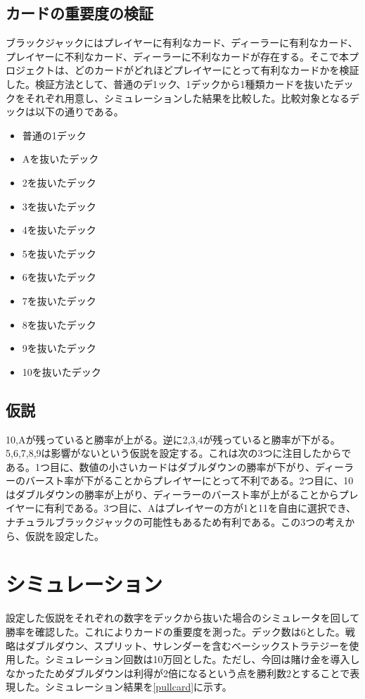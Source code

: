 \subsection{カードの重要度の検証}
ブラックジャックにはプレイヤーに有利なカード、ディーラーに有利なカード、プレイヤーに不利なカード、ディーラーに不利なカードが存在する。そこで本プロジェクトは、どのカードがどれほどプレイヤーにとって有利なカードかを検証した。検証方法として、普通のデ1ック、1デックから1種類カードを抜いたデックをそれぞれ用意し、シミュレーションした結果を比較した。比較対象となるデックは以下の通りである。

\begin{itemize}
  \item 普通の1デック
  \item Aを抜いたデック
  \item 2を抜いたデック
  \item 3を抜いたデック
  \item 4を抜いたデック
  \item 5を抜いたデック
  \item 6を抜いたデック
  \item 7を抜いたデック
  \item 8を抜いたデック
  \item 9を抜いたデック
  \item 10を抜いたデック
\end{itemize}

\subsection{仮説}
10,Aが残っていると勝率が上がる。逆に2,3,4が残っていると勝率が下がる。5,6,7,8,9は影響がないという仮説を設定する。これは次の3つに注目したからである。1つ目に、数値の小さいカードはダブルダウンの勝率が下がり、ディーラーのバースト率が下がることからプレイヤーにとって不利である。2つ目に、10はダブルダウンの勝率が上がり、ディーラーのバースト率が上がることからプレイヤーに有利である。3つ目に、Aはプレイヤーの方が1と11を自由に選択でき、ナチュラルブラックジャックの可能性もあるため有利である。この3つの考えから、仮説を設定した。

\section{シミュレーション}
設定した仮説をそれぞれの数字をデックから抜いた場合のシミュレータを回して勝率を確認した。これによりカードの重要度を測った。デック数は6とした。戦略はダブルダウン、スプリット、サレンダーを含むベーシックストラテジーを使用した。シミュレーション回数は10万回とした。ただし、今回は賭け金を導入しなかったためダブルダウンは利得が2倍になるという点を勝利数2とすることで表現した。シミュレーション結果を\ref{pullcard}に示す。

